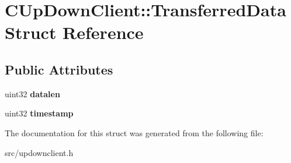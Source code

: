 \section{CUpDownClient::TransferredData Struct Reference}
\label{structCUpDownClient_1_1TransferredData}
\subsection*{Public Attributes}
\begin{DoxyCompactItemize}
\item 
uint32 {\bfseries datalen}\label{structCUpDownClient_1_1TransferredData_abc55534e73ee076b64439e686f7a06b4}

\item 
uint32 {\bfseries timestamp}\label{structCUpDownClient_1_1TransferredData_a8b01b33f70fedecfb688bfe28683c334}

\end{DoxyCompactItemize}


The documentation for this struct was generated from the following file:\begin{DoxyCompactItemize}
\item 
src/updownclient.h\end{DoxyCompactItemize}
